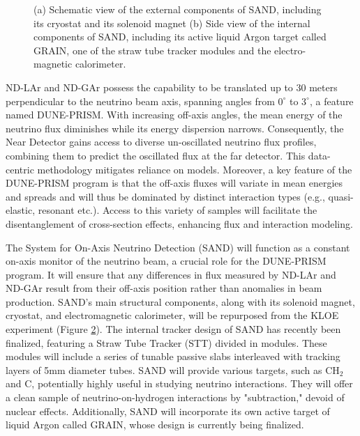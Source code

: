 \begin{figure}[t]
\begin{subfigure}[b]{0.48\textwidth}
         \caption{}
         \label{fig:SAND-inside}
     \end{subfigure}
        \caption{(a) Schematic view of the external components of SAND, including its cryostat and its solenoid magnet (b) Side view of the internal components of SAND, including its active liquid Argon target called GRAIN, one of the straw tube tracker modules and the electro-magnetic calorimeter.  }
        \label{fig:SAND-all}
\end{figure}

ND-LAr and ND-GAr possess the capability to be translated up to 30 meters perpendicular to the neutrino beam axis, spanning angles from $0^{\circ}$ to $3^{\circ}$, a feature named DUNE-PRISM. With increasing off-axis angles, the mean energy of the neutrino flux diminishes while its energy dispersion narrows. Consequently, the Near Detector gains access to diverse un-oscillated neutrino flux profiles, combining them to predict the oscillated flux at the far detector. This data-centric methodology mitigates reliance on models. Moreover, a key feature of the DUNE-PRISM program is that the off-axis fluxes will variate in mean energies and spreads and will thus be dominated by distinct interaction types (e.g., quasi-elastic, resonant etc.). Access to this variety of samples will facilitate the disentanglement of cross-section effects, enhancing flux and interaction modeling.

The System for On-Axis Neutrino Detection (SAND) will function as a constant on-axis monitor of the neutrino beam, a crucial role for the DUNE-PRISM program. It will ensure that any differences in flux measured by ND-LAr and ND-GAr result from their off-axis position rather than anomalies in beam production. SAND's main structural components, along with its solenoid magnet, cryostat, and electromagnetic calorimeter, will be repurposed from the KLOE experiment (Figure \ref{fig:SAND-all}). The internal tracker design of SAND has recently been finalized, featuring a Straw Tube Tracker (STT) divided in modules. These modules will include a series of tunable passive slabs interleaved with tracking layers of 5mm diameter tubes. SAND will provide various targets, such as CH$_2$ and C, potentially highly useful in studying neutrino interactions. They will offer a clean sample of neutrino-on-hydrogen interactions by "subtraction," devoid of nuclear effects. Additionally, SAND will incorporate its own active target of liquid Argon called GRAIN, whose design is currently being finalized. 

